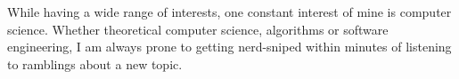 \documentclass[9pt]{developercv} %
\begin{document}
\vspace{0.6cm}



\begin{minipage}[t]{0.5\textwidth} %
	\vspace{-\baselineskip} %
    While having a wide range of interests, one constant interest of mine is computer science. Whether theoretical computer science, algorithms or software engineering, I am always prone to getting nerd-sniped within minutes of listening to ramblings about a new topic. 
\end{minipage}
\hfill %
\begin{minipage}[t]{0.4\textwidth} %
	\vspace{-\baselineskip} %
	\begin{barchart}{5.5}
	\end{barchart}
\end{minipage}





\end{document}
